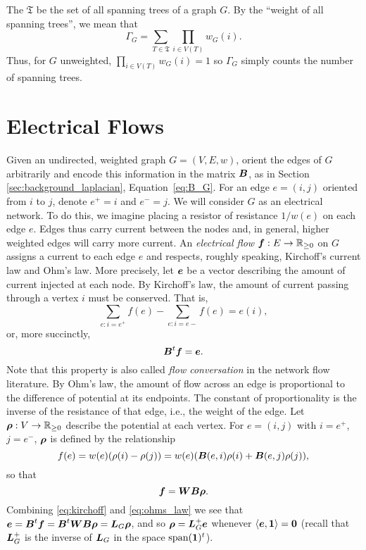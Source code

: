 \begin{remark}
	The  $\mathfrak{T}$ be the set of all spanning trees of a graph $G$. By the ``weight of all spanning trees'', we mean that
	\begin{equation}
	\label{eq:Gamma_G}
	\Gamma_G = \sum_{T\in \mathfrak{T}} \prod_{i\in  V(T)} w_G(i).
	\end{equation}
	Thus, for $G$ unweighted, $\prod_{i\in V(T)}w_G(i)=1$ so $\Gamma_G$ simply counts the number of spanning trees. 
\end{remark}




\section{Electrical Flows}
\label{sec:background_er}
Given an undirected, weighted graph $G=(V,E,w)$, orient the edges of $G$ arbitrarily and encode this information in the matrix $\vb*{B}$, as in Section \ref{sec:background_laplacian}, Equation~\eqref{eq:B_G}. For an edge $e=(i,j)$ oriented from $i$ to $j$, denote $e^+=i$ and $e^-=j$. 
We will consider $G$ as an electrical network. To do this, we imagine placing a resistor of resistance $1/w(e)$ on each edge $e$. Edges thus carry current between the nodes and, in general, higher weighted edges will carry more current.  
An \emph{electrical flow $\vb*{f}:E\to\mathbb{R}_{\geq 0}$} on $G$ assigns a current to each edge $e$ and respects, roughly speaking, Kirchoff's current law and Ohm's law. More precisely, let $\vb*{e}$ be a vector describing the amount of current injected at each node. By Kirchoff's law, the amount of current passing through a vertex $i$ must be conserved. That is, 
\[\sum_{e:i=e^+}f(e) - \sum_{e:i=e-}f(e) = e(i),\]
or, more succinctly, 
\begin{equation}
\label{eq:kirchoff}
\vb*{B}^t \vb*{f}=\vb*{e}. 
\end{equation}
Note that this property is also called \emph{flow conversation} in the network flow literature. 
By Ohm's law, the amount of flow across an edge is proportional to the difference of potential at its endpoints. The constant of proportionality is the inverse of the resistance of that edge, i.e., the weight of the edge. Let $\vb*{\rho}:V\to\mathbb{R}_{\geq 0}$ describe the potential at each vertex. For $e=(i,j)$ with $i=e^+$, $j=e^-$, $\vb*{\rho}$ is defined by the relationship 
\begin{equation*}
f(e) = w(e)(\rho(i)-\rho(j)) = w(e) (\vb*{B}(e,i)\rho(i) + \vb*{B}(e,j)\rho(j)),
\end{equation*}
so that
\begin{equation}
\label{eq:ohms_law}
\vb*{f}=\vb*{W}\vb*{B}\vb*{\rho}.
\end{equation}
Combining \eqref{eq:kirchoff} and \eqref{eq:ohms_law} we see that $\vb*{e}=\vb*{B}^t \vb*{f}=\vb*{B}^t \vb*{W}\vb*{B} \vb*{\rho} = \vb*{L}_G\vb*{\rho}$, and so $\vb*{\rho} = \vb*{L}_G^+\vb*{e}$ whenever $\langle \vb*{e},\vb{1}\rangle=\vb{0}$ (recall that $\vb*{L}_G^+$ is the inverse of $\vb*{L}_G$ in the space $\textnormal{span}(\vb{1})^t$).  

